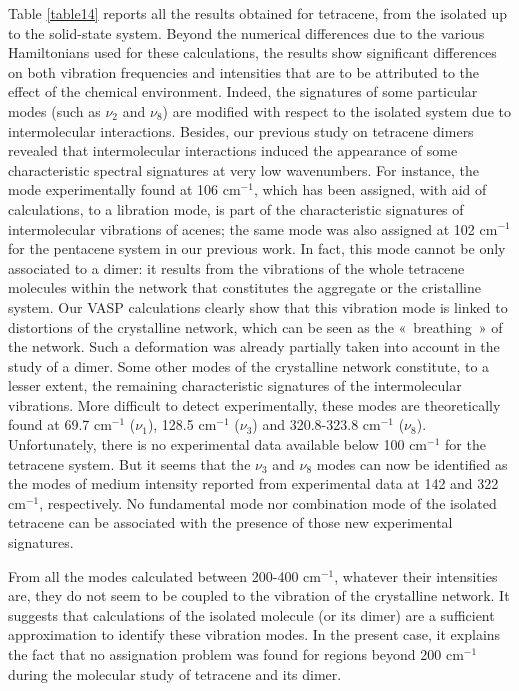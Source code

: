  Table \ref{table14} reports all the results obtained for tetracene, from the isolated up to the solid-state system. Beyond the numerical differences due to the various Hamiltonians used for these calculations, the results show significant differences on both vibration frequencies and intensities that are to be attributed to the effect of the chemical environment. Indeed, the signatures of some particular modes (such as $\nu_{2}$ and $\nu_{8}$) are modified with respect to the isolated system due to intermolecular interactions. Besides, our previous study on tetracene dimers revealed that intermolecular interactions induced the appearance of some characteristic spectral signatures at very low wavenumbers. For instance, the mode experimentally found at 106 cm$^{-1}$, which has been assigned, with aid of calculations, to a libration mode, is part of the characteristic signatures of intermolecular vibrations of acenes; the same mode was also assigned at 102 cm$^{-1}$ for the pentacene system in our previous work. In fact, this mode cannot be only associated to a dimer: it results from the vibrations of the whole tetracene molecules within the network that constitutes the aggregate or the cristalline system. Our VASP calculations clearly show that this vibration mode is linked to distortions of the  crystalline network, which can be seen as the « breathing » of the network. Such a deformation was already partially taken into account in the study of a dimer. Some other modes of the crystalline network constitute, to a lesser extent, the remaining characteristic signatures of the intermolecular vibrations. More difficult to detect experimentally, these modes are theoretically found at 69.7 cm$^{-1}$ ($\nu_{1}$), 128.5 cm$^{-1}$ ($\nu_{3}$) and 320.8-323.8 cm$^{-1}$ ($\nu_{8}$). Unfortunately, there is no experimental data available below 100 cm$^{-1}$ for the tetracene system. But it seems that the $\nu_{3}$ and $\nu_{8}$ modes can now be identified as the modes of medium intensity reported from experimental data at 142 and 322 cm$^{-1}$, respectively. No fundamental mode nor combination mode of the isolated tetracene can be associated with the presence of those new experimental signatures.
 
 From all the modes calculated between 200-400 cm$^{-1}$, whatever their intensities are, they do not seem to be coupled to the vibration of the crystalline network. It suggests that calculations of the isolated molecule (or its dimer) are a sufficient approximation to identify these vibration modes. In the present case, it explains the fact that no assignation problem was found for regions beyond 200 cm$^{-1}$ during the molecular study of tetracene and its dimer.


